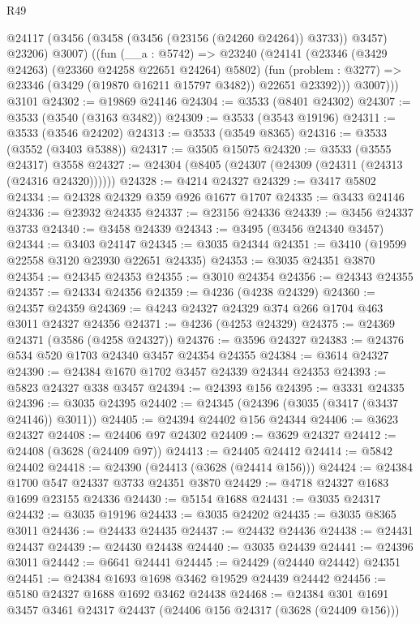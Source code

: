 \begin{lexlean}{R49}
\begin{coremodule}
        @24117 (@3456 (@3458 (@3456 (@23156 (@24260 @24264)) @3733)) @3457) @23206)
          @3007)
        ((fun (__a : @5742) =>
        @23240
          (@24141
            (@23346 (@3429 @24263) (@23360 @24258 @22651 @24264) @5802)
            (fun (problem : @3277) => @23346 (@3429 (@19870 @16211 @15797 @3482)) @22651 @23392)))
          @3007)))
    @3101
@24302 := @19869 @24146
@24304 := @3533 (@8401 @24302)
@24307 := @3533 (@3540 (@3163 @3482))
@24309 := @3533 (@3543 @19196)
@24311 := @3533 (@3546 @24202)
@24313 := @3533 (@3549 @8365)
@24316 := @3533 (@3552 (@3403 @5388))
@24317 := @3505 @15075
@24320 := @3533 (@3555 @24317) @3558
@24327 := @24304 (@8405 (@24307 (@24309 (@24311 (@24313 (@24316 @24320))))))
@24328 := @4214 @24327
@24329 := @3417 @5802
@24334 := @24328 @24329 @359 @926 @1677 @1707
@24335 := @3433 @24146
@24336 := @23932 @24335
@24337 := @23156 @24336
@24339 := @3456 @24337 @3733
@24340 := @3458 @24339
@24343 := @3495 (@3456 @24340 @3457)
@24344 := @3403 @24147
@24345 := @3035 @24344
@24351 := @3410 (@19599 @22558 @3120 @23930 @22651 @24335)
@24353 := @3035 @24351 @3870
@24354 := @24345 @24353
@24355 := @3010 @24354
@24356 := @24343 @24355
@24357 := @24334 @24356
@24359 := @4236 (@4238 @24329)
@24360 := @24357 @24359
@24369 := @4243 @24327 @24329 @374 @266 @1704 @463 @3011 @24327 @24356
@24371 := @4236 (@4253 @24329)
@24375 := @24369 @24371 (@3586 (@4258 @24327))
@24376 := @3596 @24327
@24383 := @24376 @534 @520 @1703 @24340 @3457 @24354 @24355
@24384 := @3614 @24327
@24390 := @24384 @1670 @1702 @3457 @24339 @24344 @24353
@24393 := @5823 @24327 @338 @3457
@24394 := @24393 @156
@24395 := @3331 @24335
@24396 := @3035 @24395
@24402 := @24345 (@24396 (@3035 (@3417 (@3437 @24146)) @3011))
@24405 := @24394 @24402 @156 @24344
@24406 := @3623 @24327
@24408 := @24406 @97 @24302
@24409 := @3629 @24327
@24412 := @24408 (@3628 (@24409 @97))
@24413 := @24405 @24412
@24414 := @5842 @24402
@24418 := @24390 (@24413 (@3628 (@24414 @156)))
@24424 := @24384 @1700 @547 @24337 @3733 @24351 @3870
@24429 := @4718 @24327 @1683 @1699 @23155 @24336
@24430 := @5154 @1688
@24431 := @3035 @24317
@24432 := @3035 @19196
@24433 := @3035 @24202
@24435 := @3035 @8365 @3011
@24436 := @24433 @24435
@24437 := @24432 @24436
@24438 := @24431 @24437
@24439 := @24430 @24438
@24440 := @3035 @24439
@24441 := @24396 @3011
@24442 := @6641 @24441
@24445 := @24429 (@24440 @24442) @24351
@24451 := @24384 @1693 @1698 @3462 @19529 @24439 @24442
@24456 := @5180 @24327 @1688 @1692 @3462 @24438
@24468 := @24384 @301 @1691 @3457 @3461 @24317 @24437 (@24406 @156 @24317 (@3628 (@24409 @156)))

\end{coremodule}
\end{lexlean}
